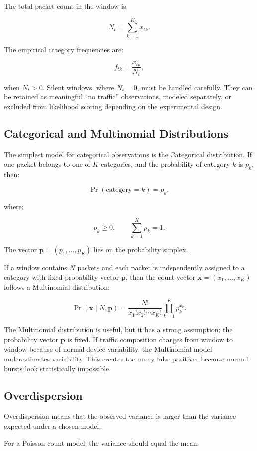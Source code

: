 \documentclass[11pt,a4paper]{article}
\begin{document}
The total packet count in the window is:

\[
N_t = \sum_{k=1}^{K} x_{tk}.
\]

The empirical category frequencies are:

\[
f_{tk} = \frac{x_{tk}}{N_t},
\]

when \(N_t > 0\). Silent windows, where \(N_t = 0\), must be handled carefully. They can be retained as meaningful ``no traffic'' observations, modeled separately, or excluded from likelihood scoring depending on the experimental design.

\subsection{Categorical and Multinomial Distributions}

The simplest model for categorical observations is the Categorical distribution. If one packet belongs to one of \(K\) categories, and the probability of category \(k\) is \(p_k\), then:

\[
\Pr(\mathrm{category}=k)=p_k,
\]

where:

\[
p_k \geq 0,\qquad \sum_{k=1}^{K} p_k = 1.
\]

The vector \(\mathbf{p}=(p_1,\ldots,p_K)\) lies on the probability simplex.

If a window contains \(N\) packets and each packet is independently assigned to a category with fixed probability vector \(\mathbf{p}\), then the count vector \(\mathbf{x}=(x_1,\ldots,x_K)\) follows a Multinomial distribution:

\[
\Pr(\mathbf{x}\mid N,\mathbf{p})
=
\frac{N!}{x_1!x_2!\cdots x_K!}
\prod_{k=1}^{K} p_k^{x_k}.
\]

The Multinomial distribution is useful, but it has a strong assumption: the probability vector \(\mathbf{p}\) is fixed. If traffic composition changes from window to window because of normal device variability, the Multinomial model underestimates variability. This creates too many false positives because normal bursts look statistically impossible.

\subsection{Overdispersion}

Overdispersion means that the observed variance is larger than the variance expected under a chosen model.

For a Poisson count model, the variance should equal the mean:
\end{document}
